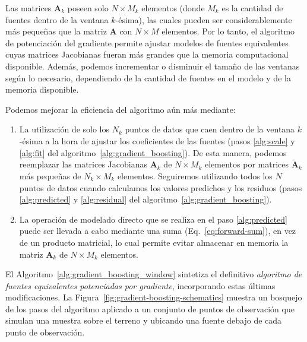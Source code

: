 Las matrices $\mathbf{A}_k$ poseen solo $N \times M_k$ elementos (donde $M_k$
es la cantidad de fuentes dentro de la ventana $k$-ésima), las cuales pueden
ser considerablemente más pequeñas que la matriz $\mathbf{A}$ con $N \times M$
elementos.
Por lo tanto, el algoritmo de potenciación del gradiente permite ajustar
modelos de fuentes equivalentes cuyas matrices Jacobianas fueran más grandes
que la memoria computacional disponible.
Además, podemos incrementar o disminuir el tamaño de las ventanas según lo
necesario, dependiendo de la cantidad de fuentes en el modelo y de la memoria
disponible.

Podemos mejorar la eficiencia del algoritmo aún más mediante:

\begin{enumerate}
  \item La utilización de solo los $N_k$ puntos de datos que caen dentro de la
      ventana $k$-ésima a la hora de ajustar los coeficientes de las fuentes
      (pasos \ref{alg:scale} y \ref{alg:fit} del
      algoritmo~\ref{alg:gradient_boosting}).
      De esta manera, podemos reemplazar las matrices Jacobianas $\mathbf{A}_k$
      de $N \times M_k$ elementos por matrices $\tilde{\mathbf{A}}_k$ más
      pequeñas de $N_k \times M_k$ elementos.
      Seguiremos utilizando todos los $N$ puntos de datos cuando calculamos los
      valores predichos y los residuos (pasos \ref{alg:predicted}
      y \ref{alg:residual} del algoritmo~\ref{alg:gradient_boosting}).
  \item La operación de modelado directo que se realiza en el paso \ref{alg:predicted}
      puede ser llevada a cabo mediante una suma (Eq.~\ref{eq:forward-sum}),
      en vez de un producto matricial, lo cual permite evitar almacenar en
      memoria la matriz $\mathbf{A}_k$ de $N \times M_k$ elementos.
\end{enumerate}

El Algoritmo~\ref{alg:gradient_boosting_window} sintetiza el definitivo
\textit{algoritmo de fuentes equivalentes potenciadas por gradiente},
incorporando estas últimas modificaciones.
La Figura~\ref{fig:gradient-boosting-schematics} muestra un bosquejo de los
pasos del algoritmo aplicado a un conjunto de puntos de observación que simulan
una muestra sobre el terreno y ubicando una fuente debajo de cada punto de
observación.

